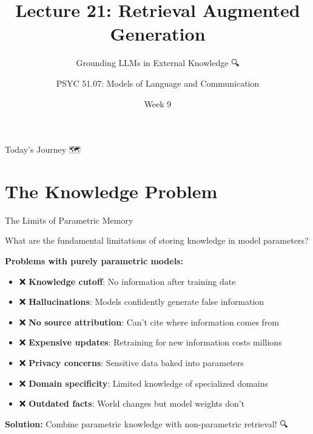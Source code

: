 \documentclass[aspectratio=169]{beamer}
\title{Lecture 21: Retrieval Augmented Generation}
\subtitle{Grounding LLMs in External Knowledge 🔍}
\author{PSYC 51.07: Models of Language and Communication}
\institute{Dr. Jeremy R. Manning}
\date{Week 9}
\begin{document}
\begin{frame}[shrink=10]
\titlepage
\end{frame}

\begin{frame}[shrink=5]{Today's Journey 🗺️}
\tableofcontents
\end{frame}

\section{The Knowledge Problem}

\begin{frame}[shrink=10]{The Limits of Parametric Memory 🧠}
\begin{discussionbox}
What are the fundamental limitations of storing knowledge in model parameters?
\end{discussionbox}

\vspace{0.5em}

\textbf{Problems with purely parametric models:}
\begin{itemize}\setlength{\itemsep}{0pt}
    \item ❌ \textbf{Knowledge cutoff}: No information after training date
    \item ❌ \textbf{Hallucinations}: Models confidently generate false information
    \item ❌ \textbf{No source attribution}: Can't cite where information comes from
    \item ❌ \textbf{Expensive updates}: Retraining for new information costs millions
    \item ❌ \textbf{Privacy concerns}: Sensitive data baked into parameters
    \item ❌ \textbf{Domain specificity}: Limited knowledge of specialized domains
    \item ❌ \textbf{Outdated facts}: World changes but model weights don't
\end{itemize}

\vspace{0.5em}
\textbf{Solution:} Combine parametric knowledge with non-parametric retrieval! 🔍
\end{frame}
\end{document}
